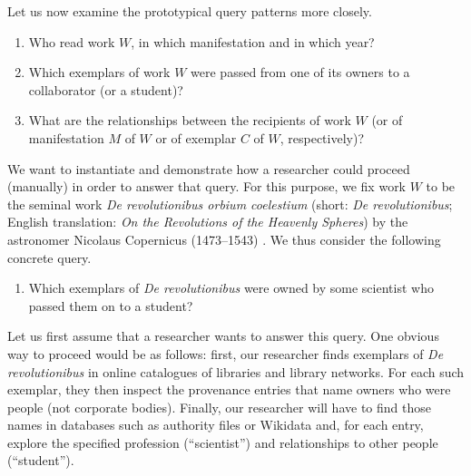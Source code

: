 Let us now examine the prototypical query patterns more closely.
%
\begin{enumerate}
  \item[\exaquery{1}]
    Who read work $W$, in which manifestation and in which year?
  \item[\exaquery{2}]
    Which exemplars of work $W$ were passed from one of its owners to a collaborator (or a student)?
  \item[\exaquery{3}]
    What are the relationships between the recipients of work $W$
    (or of manifestation $M$ of $W$ or of exemplar $C$ of $W$, respectively)?
\end{enumerate}
%
We want to instantiate  and demonstrate how a researcher
could proceed (manually) in order to answer that query.
For this purpose, we fix work $W$ to be the seminal work \emph{De revolutionibus orbium coelestium}
(short: \emph{De revolutionibus}; English translation: \emph{On the Revolutions of the Heavenly Spheres}) by the astronomer Nicolaus Copernicus (1473–1543) \autocite{Kopernikus1543}.
We thus consider the following concrete query.
%
\begin{enumerate}
  \item[\exaquery{2$'$}]
    Which exemplars of \emph{De revolutionibus} were owned by some scientist who passed them on to a student?
\end{enumerate}
%
Let us first assume that a researcher wants to answer this query.
One obvious way to proceed would be as follows: first, our researcher finds exemplars of \emph{De revolutionibus} 
in online catalogues of libraries and library networks. For each such exemplar, they then inspect the provenance entries
that name owners who were people (not corporate bodies). Finally, our researcher will have to find those names in databases such as
authority files or Wikidata and, for each entry, explore the specified profession (\enquote{scientist})
and relationships to other people (\enquote{student}).

